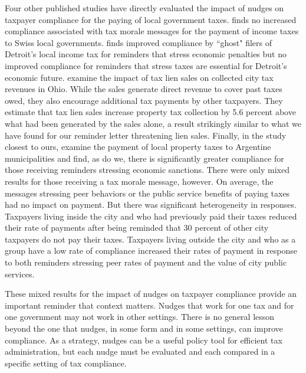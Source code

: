 \documentclass[12pt]{article}
\begin{document}
Four other published studies have directly evaluated the impact of
nudges on taxpayer compliance for the paying of local government
taxes.   finds no increased compliance
associated with tax morale messages for the payment of income taxes to
Swiss local governments.   finds improved
compliance by ``ghost" filers of Detroit's local income tax for
reminders that stress economic penalties but no improved compliance
for reminders that stress taxes are essential for Detroit's economic
future.   examine the impact of tax lien sales
on collected city tax revenues in Ohio.  While the sales generate
direct revenue to cover past taxes owed, they also encourage
additional tax payments by other taxpayers.  They estimate that tax
lien sales increase property tax collection by 5.6 percent above what
had been generated by the sales alone, a result strikingly similar to
what we have found for our reminder letter threatening lien sales.
Finally, in the study closest to ours,  examine the
payment of local property taxes to Argentine municipalities and find,
as do we, there is significantly greater compliance for those
receiving reminders stressing economic sanctions. There were only
mixed results for those receiving a tax morale message, however.  On
average, the messages stressing peer behaviors or the public service
benefits of paying taxes had no impact on payment.  But there was
significant heterogeneity in responses.  Taxpayers living inside the
city and who had previously paid their taxes reduced their rate of
payments after being reminded that 30 percent of other city taxpayers
do not pay their taxes.  Taxpayers living outside the city and who as
a group have a low rate of compliance increased their rates of payment
in response to both reminders stressing peer rates of payment and the
value of city public services.

These mixed results for the impact of nudges on taxpayer compliance
provide an important reminder that context matters.  Nudges that work
for one tax and for one government may not work in other
settings. There is no general lesson beyond the one that nudges,
in some form and in some settings, can improve compliance.  As a
strategy, nudges can be a useful policy tool for efficient tax
administration, but each nudge must be evaluated and each compared in
a specific setting of tax compliance.
\end{document}

